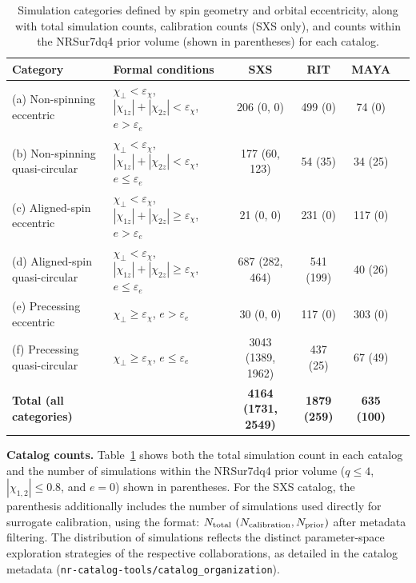 \documentclass[%
 reprint,
superscriptaddress,
 amsmath,amssymb,
 aps,
]{revtex4-2}
\begin{document}
\begin{table}[t]
\centering
\caption{Simulation categories defined by spin geometry and orbital eccentricity, along with total simulation counts, calibration counts (SXS only), and counts within the NRSur7dq4 prior volume (shown in parentheses) for each catalog.}
\label{tab:categories_counts}
\begin{tabular}{llcccc}
\toprule
Category & Formal conditions & SXS & RIT & MAYA \\
\midrule
(a) Non-spinning eccentric & $\chi_\perp < \varepsilon_\chi$, $|\chi_{1z}| + |\chi_{2z}| < \varepsilon_\chi$, $e > \varepsilon_e$ & 206 (0, 0) & 499 (0) & 74 (0) \\
(b) Non-spinning quasi-circular & $\chi_\perp < \varepsilon_\chi$, $|\chi_{1z}| + |\chi_{2z}| < \varepsilon_\chi$, $e \leq \varepsilon_e$ & 177 (60, 123) & 54 (35) & 34 (25) \\
(c) Aligned-spin eccentric & $\chi_\perp < \varepsilon_\chi$, $|\chi_{1z}| + |\chi_{2z}| \geq \varepsilon_\chi$, $e > \varepsilon_e$ & 21 (0, 0) & 231 (0) & 117 (0) \\
(d) Aligned-spin quasi-circular & $\chi_\perp < \varepsilon_\chi$, $|\chi_{1z}| + |\chi_{2z}| \geq \varepsilon_\chi$, $e \leq \varepsilon_e$ & 687 (282, 464) & 541 (199) & 40 (26) \\
(e) Precessing eccentric & $\chi_\perp \geq \varepsilon_\chi$, $e > \varepsilon_e$ & 30 (0, 0) & 117 (0) & 303 (0) \\
(f) Precessing quasi-circular & $\chi_\perp \geq \varepsilon_\chi$, $e \leq \varepsilon_e$ & 3043 (1389, 1962) & 437 (25) & 67 (49) \\
\midrule
\textbf{Total (all categories)} & & \textbf{4164 (1731, 2549)} & \textbf{1879 (259)} & \textbf{635 (100)} \\
\bottomrule
\end{tabular}
\end{table}

\textbf{Catalog counts.} Table~\ref{tab:categories_counts} shows both the total simulation count in each catalog and the number of simulations within the NRSur7dq4 prior volume ($q \leq 4$, $|\chi_{1,2}| \leq 0.8$, and $e = 0$) shown in parentheses. For the SXS catalog, the parenthesis additionally includes the number of simulations used directly for surrogate calibration, using the format: $N_{\rm total}~(N_{\rm calibration}, N_{\rm prior})$ after metadata filtering.
The distribution of simulations reflects the distinct parameter-space exploration strategies of the respective collaborations, as detailed in the catalog metadata (\texttt{nr-catalog-tools/catalog\_organization}). 
\end{document}

